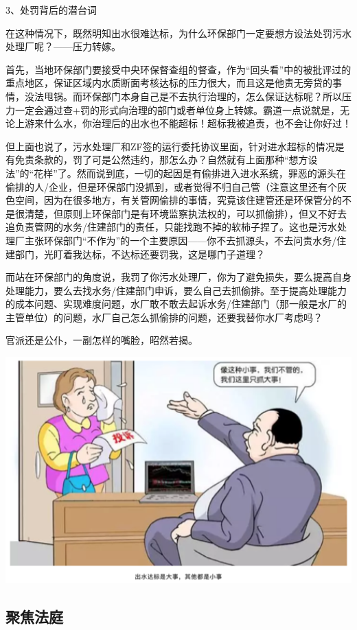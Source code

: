 \documentclass[
]{book}
\begin{document}
3、处罚背后的潜台词

在这种情况下，既然明知出水很难达标，为什么环保部门一定要想方设法处罚污水处理厂呢？------压力转嫁。

首先，当地环保部门要接受中央环保督查组的督查，作为``回头看''中的被批评过的重点地区，保证区域内水质断面考核达标的压力很大，而且这是他责无旁贷的事情，没法甩锅。而环保部门本身自己是不去执行治理的，怎么保证达标呢？所以压力一定会通过查+罚的形式向治理的部门或者单位身上转嫁。霸道一点说就是，无论上游来什么水，你治理后的出水也不能超标！超标我被追责，也不会让你好过！

但上面也说了，污水处理厂和ZF签的运行委托协议里面，针对进水超标的情况是有免责条款的，罚了可是公然违约，那怎么办？自然就有上面那种``想方设法''的``花样''了。然而说到底，一切的起因是有偷排进入进水系统，罪恶的源头在偷排的人/企业，但是环保部门没抓到，或者觉得不归自己管（注意这里还有个灰色空间，因为在很多地方，有关管网偷排的事情，究竟该住建管还是环保管分的不是很清楚，但原则上环保部门是有环境监察执法权的，可以抓偷排），但又不好去追负责管网的水务/住建部门的责任，只能找跑不掉的软柿子捏了。这也是污水处理厂主张环保部门``不作为''的一个主要原因------你不去抓源头，不去问责水务/住建部门，光盯着我达标，不达标还要罚我，这是哪门子道理？

而站在环保部门的角度说，我罚了你污水处理厂，你为了避免损失，要么提高自身处理能力，要么去找水务/住建部门申诉，要么自己去抓偷排。至于提高处理能力的成本问题、实现难度问题，水厂敢不敢去起诉水务/住建部门（那一般是水厂的主管单位）的问题，水厂自己怎么抓偷排的问题，还要我替你水厂考虑吗？

官派还是公仆，一副怎样的嘴脸，昭然若揭。

\includegraphics[width=6.67in]{images/py3}

\hypertarget{ux805aux7126ux6cd5ux5ead}{%
\subsection{聚焦法庭}\label{ux805aux7126ux6cd5ux5ead}}
\end{document}

